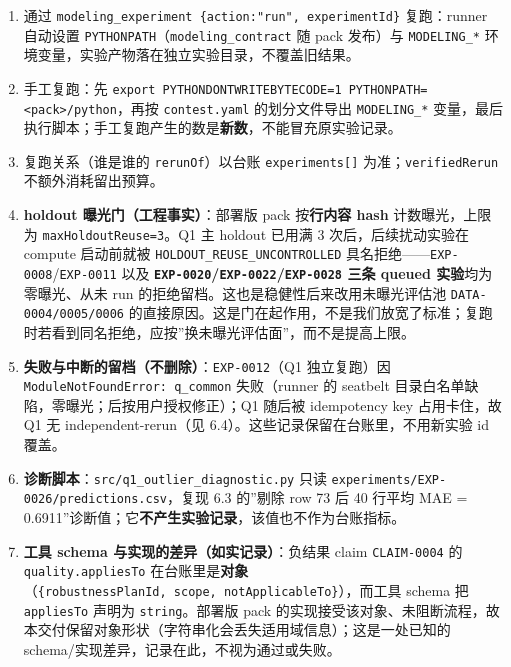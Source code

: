 \documentclass[
  11pt,
]{ctexart}
\providecommand{\tightlist}{%
  \setlength{\itemsep}{0pt}\setlength{\parskip}{0pt}}
\begin{document}
\begin{enumerate}
\def\labelenumi{\arabic{enumi}.}
\tightlist
\item
  通过 \texttt{modeling\_experiment\ \{action:"run",\ experimentId\}}
  复跑：runner 自动设置 \texttt{PYTHONPATH}（\texttt{modeling\_\allowbreak{}contract}
  随 pack 发布）与 \texttt{MODELING\_*}
  环境变量，实验产物落在独立实验目录，不覆盖旧结果。
\item
  手工复跑：先
  \texttt{export\ PYTHONDONTWRITEBYTECODE=1\ PYTHONPATH=\textless{}pack\textgreater{}/python}，再按
  \texttt{contest.yaml} 的划分文件导出 \texttt{MODELING\_*}
  变量，最后执行脚本；手工复跑产生的数是\textbf{新数}，不能冒充原实验记录。
\item
  复跑关系（谁是谁的 \texttt{rerunOf}）以台账 \texttt{experiments{[}{]}}
  为准；\texttt{verifiedRerun} 不额外消耗留出预算。
\item
  \textbf{holdout 曝光门（工程事实）}：部署版 pack 按\textbf{行内容
  hash} 计数曝光，上限为 \texttt{maxHoldoutReuse=3}。Q1 主 holdout
  已用满 3 次后，后续扰动实验在 compute 启动前就被
  \texttt{HOLDOUT\_\allowbreak{}REUSE\_\allowbreak{}UNCONTROLLED}
  具名拒绝------\texttt{EXP-0008}/\texttt{EXP-0011} 以及
  \textbf{\texttt{EXP-0020}/\texttt{EXP-0022}/\texttt{EXP-0028} 三条
  queued 实验}均为零曝光、从未 run
  的拒绝留档。这也是稳健性后来改用未曝光评估池
  \texttt{DATA-0004/\allowbreak{}0005/\allowbreak{}0006}
  的直接原因。这是门在起作用，不是我们放宽了标准；复跑时若看到同名拒绝，应按''换未曝光评估面''，而不是提高上限。
\item
  \textbf{失败与中断的留档（不删除）}：\texttt{EXP-0012}（Q1
  独立复跑）因 \texttt{ModuleNotFoundError:\ q\_\allowbreak{}common} 失败（runner 的
  seatbelt 目录白名单缺陷，零曝光；后按用户授权修正）；Q1 随后被
  idempotency key 占用卡住，故 Q1 无 independent-rerun（见
  6.4）。这些记录保留在台账里，不用新实验 id 覆盖。
\item
  \textbf{诊断脚本}：\texttt{src/\allowbreak{}q1\_\allowbreak{}outlier\_\allowbreak{}diagnostic.\allowbreak{}py} 只读
  \texttt{experiments/\allowbreak{}EXP-0026/\allowbreak{}predictions.\allowbreak{}csv}，复现 6.3 的''剔除 row
  73 后 40 行平均 MAE =
  0.6911''诊断值；它\textbf{不产生实验记录}，该值也不作为台账指标。
\item
  \textbf{工具 schema 与实现的差异（如实记录）}：负结果 claim
  \texttt{CLAIM-0004} 的 \texttt{quality.\allowbreak{}appliesTo}
  在台账里是\textbf{对象}（\texttt{\{robustnessPlanId,\ scope,\ notApplicableTo\}}），而工具
  schema 把 \texttt{appliesTo} 声明为 \texttt{string}。部署版 pack
  的实现接受该对象、未阻断流程，故本交付保留对象形状（字符串化会丢失适用域信息）；这是一处已知的
  schema/实现差异，记录在此，不视为通过或失败。
\end{enumerate}
\end{document}
